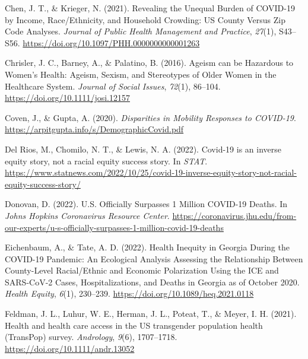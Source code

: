 \documentclass[
]{article}
\newlength{\cslhangindent}
\newlength{\cslentryspacingunit} %
\newenvironment{CSLReferences}[2] %
 {%
  \setlength{\parindent}{0pt}
  \ifodd #1
  \let\oldpar\par
  \def\par{\hangindent=\cslhangindent\oldpar}
  \fi
  \setlength{\parskip}{#2\cslentryspacingunit}
 }%
 {}
\begin{document}
\begin{CSLReferences}{1}{0}
\leavevmode{}%
Chen, J. T., \& Krieger, N. (2021). Revealing the {Unequal} {Burden} of {COVID}-19 by {Income}, {Race}/{Ethnicity}, and {Household} {Crowding}: {US} {County} {Versus} {Zip} {Code} {Analyses}. \emph{Journal of Public Health Management and Practice}, \emph{27}(1), S43--S56. \url{https://doi.org/10.1097/PHH.0000000000001263}

\leavevmode{}%
Chrisler, J. C., Barney, A., \& Palatino, B. (2016). Ageism can be {Hazardous} to {Women}'s {Health}: {Ageism}, {Sexism}, and {Stereotypes} of {Older} {Women} in the {Healthcare} {System}. \emph{Journal of Social Issues}, \emph{72}(1), 86--104. \url{https://doi.org/10.1111/josi.12157}

\leavevmode{}%
Coven, J., \& Gupta, A. (2020). \emph{Disparities in {Mobility} {Responses} to {COVID}-19}. \url{https://arpitgupta.info/s/DemographicCovid.pdf}

\leavevmode{}%
Del Rios, M., Chomilo, N. T., \& Lewis, N. A. (2022). Covid-19 is an inverse equity story, not a racial equity success story. In \emph{STAT}. \url{https://www.statnews.com/2022/10/25/covid-19-inverse-equity-story-not-racial-equity-success-story/}

\leavevmode{}%
Donovan, D. (2022). U.{S}. {Officially} {Surpasses} 1 {Million} {COVID}-19 {Deaths}. In \emph{Johns Hopkins Coronavirus Resource Center}. \url{https://coronavirus.jhu.edu/from-our-experts/u-s-officially-surpasses-1-million-covid-19-deaths}

\leavevmode{}%
Eichenbaum, A., \& Tate, A. D. (2022). Health {Inequity} in {Georgia} {During} the {COVID}-19 {Pandemic}: {An} {Ecological} {Analysis} {Assessing} the {Relationship} {Between} {County}-{Level} {Racial}/{Ethnic} and {Economic} {Polarization} {Using} the {ICE} and {SARS}-{CoV}-2 {Cases}, {Hospitalizations}, and {Deaths} in {Georgia} as of {October} 2020. \emph{Health Equity}, \emph{6}(1), 230--239. \url{https://doi.org/10.1089/heq.2021.0118}

\leavevmode{}%
Feldman, J. L., Luhur, W. E., Herman, J. L., Poteat, T., \& Meyer, I. H. (2021). Health and health care access in the {US} transgender population health ({TransPop}) survey. \emph{Andrology}, \emph{9}(6), 1707--1718. \url{https://doi.org/10.1111/andr.13052}


\end{CSLReferences}
\end{document}

